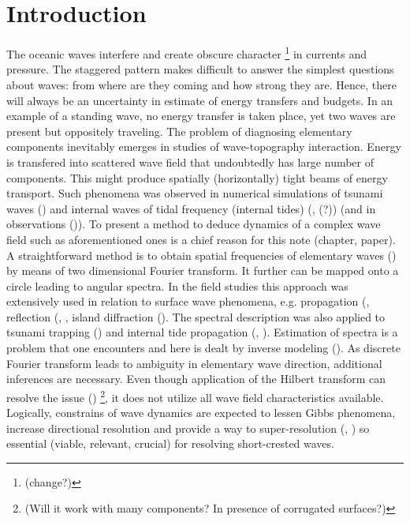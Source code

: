 \section{Introduction}
The oceanic waves interfere and create obscure character \footnote{(change?)} in currents and pressure. The staggered pattern makes difficult to answer the simplest questions about waves: from where are they coming and how strong they are. Hence, there will always be an uncertainty in estimate of energy transfers and budgets. In an example of a standing wave, no energy transfer is taken place, yet two waves are present but oppositely traveling. The problem of diagnosing elementary components inevitably emerges in studies of wave-topography interaction. Energy is transfered into scattered wave field that undoubtedly has large number of components. This might produce spatially (horizontally) tight beams of energy transport. Such phenomena was observed in numerical simulations of tsunami waves (\cite{tang2012direct}) and internal waves of tidal frequency (internal tides) (\cite{simmons2004internal}, \cite{arbic2010concurrent}(?)) (and in observations (\cite{zhao2016global})). To present a method to deduce dynamics of a complex wave field such as aforementioned ones is a chief reason for this note (chapter, paper).\\%

A straightforward method is to obtain spatial frequencies of elementary waves (\cite{barber1963directional}) by means of two dimensional Fourier transform. It further can be mapped onto a circle leading to angular spectra. In the field studies this approach was extensively used in relation to surface wave phenomena, e.g. propagation (\cite{munk1963directional}, reflection (\cite{dickson1995wave}, \cite{thomson2005reflection}, island diffraction (\cite{pawka1983island}). The spectral description was also applied to tsunami trapping (\cite{romano2013wavenumber}) and internal tide propagation (\cite{hendry1977observations}, \cite{lozovatsky2003spatial}). Estimation of spectra is a problem that one encounters and here is dealt by inverse modeling (\cite{long1986inverse}). As discrete Fourier transform leads to ambiguity in elementary wave direction, additional inferences are necessary. Even though application of the Hilbert transform can resolve the issue (\cite{mercier2008reflection}) \footnote{(Will it work with many components? In presence of corrugated surfaces?)}, it does not utilize all wave field characteristics available. Logically, constrains of wave dynamics are expected to lessen Gibbs phenomena, increase directional resolution and provide a way to super-resolution (\cite{kay1981spectrum}, \cite{sacchi1998interpolation}) so essential (viable, relevant, crucial) for resolving short-crested waves.\\

